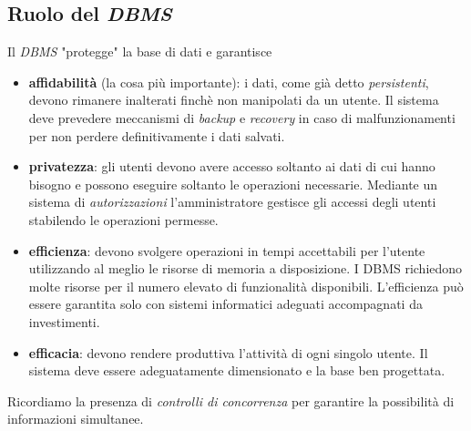 \subsection{Ruolo del \emph{DBMS}}
Il \emph{DBMS} "protegge" la base di dati e garantisce 
\begin{itemize}
	\item \textbf{affidabilità} (la cosa più importante): i dati, come già detto \emph{persistenti}, devono rimanere inalterati finchè non manipolati da un utente. Il sistema deve prevedere meccanismi di \emph{backup} e \emph{recovery} in caso di malfunzionamenti per non perdere definitivamente i dati salvati.
	\item \textbf{privatezza}: gli utenti devono avere accesso soltanto ai dati di cui hanno bisogno e possono eseguire soltanto le operazioni necessarie. Mediante un sistema di \emph{autorizzazioni} l'amministratore gestisce gli accessi degli utenti stabilendo le operazioni permesse.
	\item \textbf{efficienza}: devono svolgere operazioni in tempi accettabili per l'utente utilizzando al meglio le risorse di memoria a disposizione. I DBMS richiedono molte risorse per il numero elevato di funzionalità disponibili. L'efficienza può essere garantita solo con sistemi informatici adeguati accompagnati da investimenti.
	\item \textbf{efficacia}: devono rendere produttiva l'attività di ogni singolo utente. Il sistema deve essere adeguatamente dimensionato e la base ben progettata.
\end{itemize}
Ricordiamo la presenza di \emph{controlli di concorrenza} per garantire la possibilità di informazioni simultanee.
